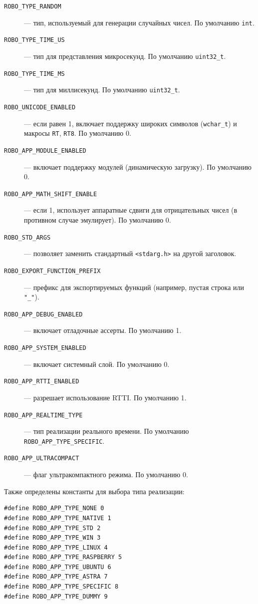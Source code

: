 \documentclass[a4paper,12pt]{article}
\begin{document}
\begin{description}
    \item[\texttt{ROBO\_TYPE\_RANDOM}] — тип, используемый для генерации случайных чисел. По умолчанию \texttt{int}.
    \item[\texttt{ROBO\_TYPE\_TIME\_US}] — тип для представления микросекунд. По умолчанию \texttt{uint32\_t}.
    \item[\texttt{ROBO\_TYPE\_TIME\_MS}] — тип для миллисекунд. По умолчанию \texttt{uint32\_t}.
    \item[\texttt{ROBO\_UNICODE\_ENABLED}] — если равен 1, включает поддержку широких символов (\texttt{wchar\_t}) и макросы \texttt{RT}, \texttt{RT8}. По умолчанию 0.
    \item[\texttt{ROBO\_APP\_MODULE\_ENABLED}] — включает поддержку модулей (динамическую загрузку). По умолчанию 0.
    \item[\texttt{ROBO\_APP\_MATH\_SHIFT\_ENABLE}] — если 1, использует аппаратные сдвиги для отрицательных чисел (в противном случае эмулирует). По умолчанию 0.
    \item[\texttt{ROBO\_STD\_ARGS}] — позволяет заменить стандартный \texttt{<stdarg.h>} на другой заголовок.
    \item[\texttt{ROBO\_EXPORT\_FUNCTION\_PREFIX}] — префикс для экспортируемых функций (например, пустая строка или \texttt{"\_"}).
    \item[\texttt{ROBO\_APP\_DEBUG\_ENABLED}] — включает отладочные ассерты. По умолчанию 1.
    \item[\texttt{ROBO\_APP\_SYSTEM\_ENABLED}] — включает системный слой. По умолчанию 0.
    \item[\texttt{ROBO\_APP\_RTTI\_ENABLED}] — разрешает использование RTTI. По умолчанию 1.
    \item[\texttt{ROBO\_APP\_REALTIME\_TYPE}] — тип реализации реального времени. По умолчанию \texttt{ROBO\_APP\_TYPE\_SPECIFIC}.
    \item[\texttt{ROBO\_APP\_ULTRACOMPACT}] — флаг ультракомпактного режима. По умолчанию 0.
\end{description}

Также определены константы для выбора типа реализации:
\begin{lstlisting}[caption={Platform type constants}]
#define ROBO_APP_TYPE_NONE 0
#define ROBO_APP_TYPE_NATIVE 1
#define ROBO_APP_TYPE_STD 2
#define ROBO_APP_TYPE_WIN 3
#define ROBO_APP_TYPE_LINUX 4
#define ROBO_APP_TYPE_RASPBERRY 5
#define ROBO_APP_TYPE_UBUNTU 6
#define ROBO_APP_TYPE_ASTRA 7
#define ROBO_APP_TYPE_SPECIFIC 8
#define ROBO_APP_TYPE_DUMMY 9
\end{lstlisting}
\end{document}
